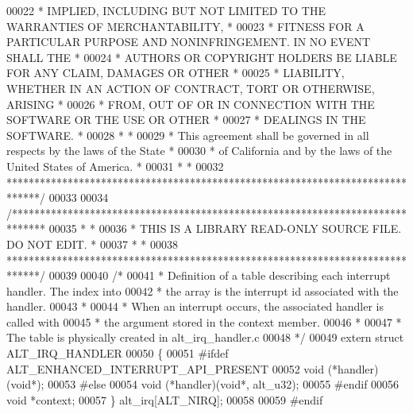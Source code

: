 \begin{DoxyCode}
00022 \textcolor{comment}{* IMPLIED, INCLUDING BUT NOT LIMITED TO THE WARRANTIES OF MERCHANTABILITY,    *}
00023 \textcolor{comment}{* FITNESS FOR A PARTICULAR PURPOSE AND NONINFRINGEMENT. IN NO EVENT SHALL THE *}
00024 \textcolor{comment}{* AUTHORS OR COPYRIGHT HOLDERS BE LIABLE FOR ANY CLAIM, DAMAGES OR OTHER      *}
00025 \textcolor{comment}{* LIABILITY, WHETHER IN AN ACTION OF CONTRACT, TORT OR OTHERWISE, ARISING     *}
00026 \textcolor{comment}{* FROM, OUT OF OR IN CONNECTION WITH THE SOFTWARE OR THE USE OR OTHER         *}
00027 \textcolor{comment}{* DEALINGS IN THE SOFTWARE.                                                   *}
00028 \textcolor{comment}{*                                                                             *}
00029 \textcolor{comment}{* This agreement shall be governed in all respects by the laws of the State   *}
00030 \textcolor{comment}{* of California and by the laws of the United States of America.              *}
00031 \textcolor{comment}{*                                                                             *}
00032 \textcolor{comment}{******************************************************************************/}
00033 
00034 \textcolor{comment}{/******************************************************************************}
00035 \textcolor{comment}{*                                                                             *}
00036 \textcolor{comment}{* THIS IS A LIBRARY READ-ONLY SOURCE FILE. DO NOT EDIT.                       *}
00037 \textcolor{comment}{*                                                                             *}
00038 \textcolor{comment}{******************************************************************************/}
00039 
00040 \textcolor{comment}{/*}
00041 \textcolor{comment}{ * Definition of a table describing each interrupt handler. The index into }
00042 \textcolor{comment}{ * the array is the interrupt id associated with the handler. }
00043 \textcolor{comment}{ *}
00044 \textcolor{comment}{ * When an interrupt occurs, the associated handler is called with}
00045 \textcolor{comment}{ * the argument stored in the context member.}
00046 \textcolor{comment}{ *}
00047 \textcolor{comment}{ * The table is physically created in alt\_irq\_handler.c }
00048 \textcolor{comment}{ */}
00049 \textcolor{keyword}{extern} \textcolor{keyword}{struct }ALT_IRQ_HANDLER
00050 \{
00051 \textcolor{preprocessor}{#ifdef ALT\_ENHANCED\_INTERRUPT\_API\_PRESENT}
00052   void (*handler)(\textcolor{keywordtype}{void}*);
00053 \textcolor{preprocessor}{#else}
00054   void (*handler)(\textcolor{keywordtype}{void}*, alt_u32);
00055 \textcolor{preprocessor}{#endif}
00056   \textcolor{keywordtype}{void} *context;
00057 \} alt_irq[ALT_NIRQ];
00058 
00059 \textcolor{preprocessor}{#endif}
\end{DoxyCode}

